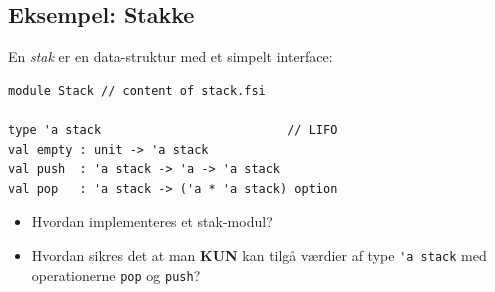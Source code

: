 \documentclass[rgb]{beamer}
\begin{document}
\subsection{Eksempel: Stakke}

\begin{frame}[fragile]
\begin{footnotesize}


  \vspace{1ex}

\begin{minipage}[b]{0.80\textwidth}

  En \emph{stak} er en data-struktur med et simpelt interface:

  \vspace{1ex}

\begin{lstlisting}[numbers=none,frame=none,mathescape]
module Stack // content of stack.fsi

type 'a stack                          // LIFO
val empty : unit -> 'a stack
val push  : 'a stack -> 'a -> 'a stack
val pop   : 'a stack -> ('a * 'a stack) option
\end{lstlisting}
  \vspace{1ex}
\begin{itemize}
\item Hvordan implementeres et stak-modul?
\item Hvordan sikres det at man \textbf{KUN} kan tilgå værdier af type
  \lstinline{'a stack} med operationerne \lstinline{pop} og
  \lstinline{push}?
\end{itemize}

\end{minipage} \hspace{-8mm}
\begin{minipage}[b]{0.16\textwidth}


\end{minipage}
\end{footnotesize}
\end{frame}
\end{document}
